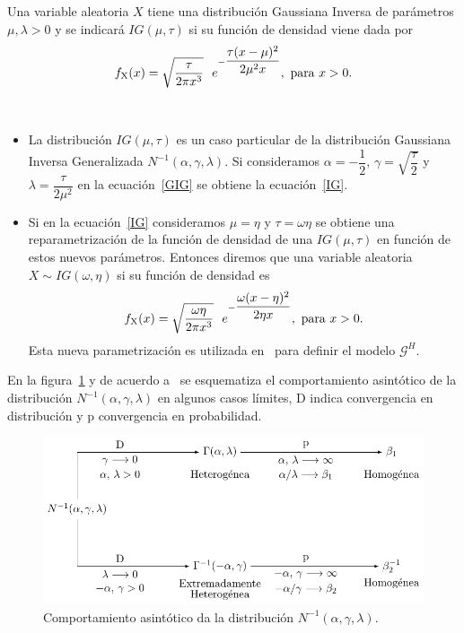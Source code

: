 \begin{definition}
	\label{InversaGaussiana}
	Una variable aleatoria $X$ tiene una distribución Gaussiana Inversa de parámetros $\mu, \lambda >0$  y se indicará $IG(\mu,\tau)$ si su función de densidad viene dada por
	\begin{align}
	\label{IG}
	f_{\text X}(x)=\sqrt{\dfrac{\tau}{2 \pi x^3}} \ \ e^{- \dfrac{\tau (x-\mu)^2}{2 \mu^2 x}}, \text{ para } x>0.
	\end{align}
\end{definition}

\begin{remark} \ 
	\begin{itemize}
		\item La distribución $IG(\mu,\tau)$ es un caso particular de la distribución Gaussiana Inversa Generalizada $N^{-1}(\alpha,\gamma,\lambda)$. Si consideramos $\alpha=-\dfrac{1}{2}$, $\gamma=\sqrt{\dfrac{\tau}{2}}$ y $\lambda=\dfrac{\tau}{2\mu^2}$ en la ecuación~\eqref{GIG} se obtiene la ecuación~\eqref{IG}.
		\item Si en la ecuación~\eqref{IG} consideramos $\mu=\eta$ y $\tau=\omega \eta$ se obtiene una reparametrización de la función de densidad de una $IG(\mu,\tau)$ en función de estos nuevos parámetros. Entonces diremos que una variable aleatoria $X \sim IG(\omega,\eta)$ si su función de densidad es 
		\begin{align}
		\label{OtraIG}
		f_{\text X}(x)=\sqrt{\dfrac{\omega \eta}{2 \pi x^3}} \ \ e^{- \dfrac{\omega (x-\eta)^2}{2 \eta x}}, \text{ para } x>0.
		\end{align}
		Esta nueva parametrización es utilizada en~\cite{Buemi2009} para definir el modelo $\mathcal{G}^H$.
	\end{itemize} 
\end{remark}


En la figura~\ref{RelacionInversaGaussiana} y de acuerdo a~\cite{Frery99} se esquematiza el comportamiento asintótico de la distribución $N^{-1}(\alpha,\gamma,\lambda)$ en algunos casos límites, D indica convergencia en distribución y p convergencia en probabilidad.

\begin{figure}[hbt]
	\centering    
	\includegraphics[scale=1]{../../Figures/Tesis/Capitulo4/RelacionInversaGaussiana.pdf}
	\caption{\label{RelacionInversaGaussiana}Comportamiento asintótico da la distribución $N^{-1}(\alpha,\gamma,\lambda)$.} %
\end{figure} 

